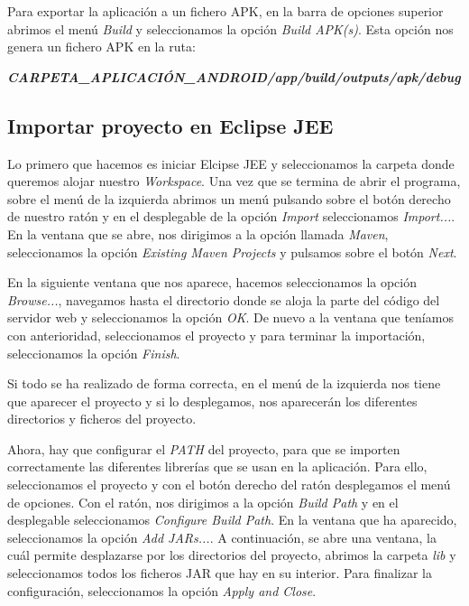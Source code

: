 
Para exportar la aplicación a un fichero APK, en la barra de opciones superior abrimos el menú \textit{Build} y seleccionamos la opción \textit{Build APK(s)}. Esta opción nos genera un fichero APK en la ruta:
\begin{center}
	\textit{\textbf{CARPETA\_APLICACIÓN\_ANDROID/app/build/outputs/apk/debug}}
\end{center}

\subsection{Importar proyecto en Eclipse JEE}

Lo primero que hacemos es iniciar Elcipse JEE y seleccionamos la carpeta donde queremos alojar nuestro \textit{Workspace}. Una vez que se termina de abrir el programa, sobre el menú de la izquierda abrimos un menú pulsando sobre el botón derecho de nuestro ratón y en el desplegable de la opción \textit{Import} seleccionamos \textit{Import...}. En la ventana que se abre, nos dirigimos a la opción llamada \textit{Maven}, seleccionamos la opción \textit{Existing Maven Projects} y pulsamos sobre el botón \textit{Next}.


En la siguiente ventana que nos aparece, hacemos seleccionamos la opción \textit{Browse...}, navegamos hasta el directorio donde se aloja la parte del código del servidor web y seleccionamos la opción \textit{OK}. De nuevo a la ventana que teníamos con anterioridad, seleccionamos el proyecto y para terminar la importación, seleccionamos la opción \textit{Finish}.



Si todo se ha realizado de forma correcta, en el menú de la izquierda nos tiene que aparecer el proyecto y si lo desplegamos, nos aparecerán los diferentes directorios y ficheros del proyecto.


Ahora, hay que configurar el \textit{PATH} del proyecto, para que se importen correctamente las diferentes librerías que se usan en la aplicación. Para ello, seleccionamos el proyecto y con el botón derecho del ratón desplegamos el menú de opciones. Con el ratón, nos dirigimos a la opción \textit{Build Path} y en el desplegable seleccionamos \textit{Configure Build Path}. En la ventana que ha aparecido, seleccionamos la opción \textit{Add JARs...}. A continuación, se abre una ventana, la cuál permite desplazarse por los directorios del proyecto, abrimos la carpeta \textit{lib} y seleccionamos todos los ficheros JAR que hay en su interior. Para finalizar la configuración, seleccionamos la opción \textit{Apply and Close}.

